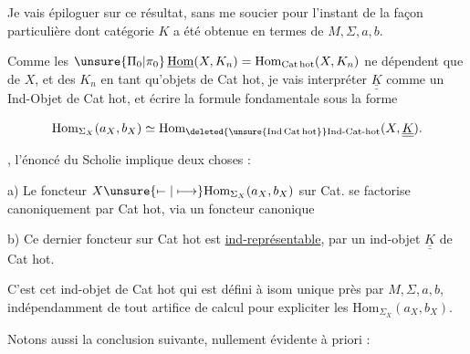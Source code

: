 
Je vais épiloguer sur ce résultat, sans me soucier pour l'instant de la façon particulière dont    catégorie $K$ a été obtenue en termes de $M,\Sigma,a,b$.

 Comme les $\unsure{\Pi_0|\pi_0}\,\underline{\mathrm{Hom}}(X,K_n)=\mathrm{Hom}_{\mathrm{Cat\,hot}}(X,K_n)$ ne dépendent que de $X$, et des $K_n$ en tant qu'objets de Cat hot,  je vais interpréter $\underline{\underline K}$ comme un Ind-Objet de Cat hot, et écrire la formule fondamentale sous la forme

\[
\mathrm{Hom}_{\Sigma_X}(a_X,b_X)\simeq
 \mathrm{Hom}_{\deleted{\unsure{\mathrm{Ind\,Cat\,hot}}}\mathrm{Ind\text{-}Cat\text{-}hot}}(X,\underline{\underline K}).
\]

, l'énoncé du Scholie implique deux choses :

a) Le  foncteur $X\unsure{\mapstochar\relbar|\longmapsto}\mathrm{Hom}_{\Sigma_X}(a_X,b_X)$ sur Cat. se factorise canoniquement par Cat hot, via un foncteur canonique


b) Ce dernier  foncteur  sur Cat hot est \uline{ind-représentable}, par un ind-objet $\underline{\underline K}$ de Cat hot.

C'est cet ind-objet de Cat hot qui est défini à isom unique près par $M,\Sigma,a,b$, indépendamment de tout artifice de calcul pour expliciter les $\mathrm{Hom}_{\Sigma_X}(a_X,b_X)$.

Notons  aussi la conclusion suivante, nullement évidente à priori :

